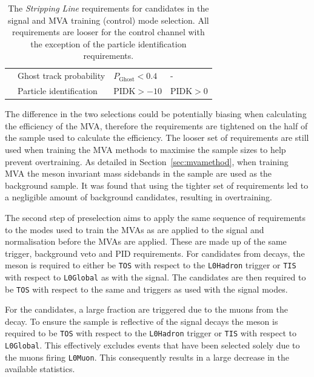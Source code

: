 \begin{table}[h]
\begin{center}
\begin{tabular}{ l l l l }
               & Ghost track probability        &  $P_{\text{Ghost}} < 0.4$            &  -                                      \\
               & Particle identification        &  $\text{PIDK}>-10$                   & $\text{PIDK}>0$                         \\ 
\hline
\end{tabular}
\end{center}
\caption{The \emph{Stripping Line} requirements for \decay{\phiz}{\Kp\Km} candidates in the signal and MVA training (control) mode selection. All requirements are looser for the control channel with the exception of the particle identification requirements.}
\label{tab:strippingrequirments_phi}
\end{table}

The difference in the two selections could be potentially biasing when calculating the efficiency of the MVA, therefore the requirements are tightened on the half of the \decay{\Bs}{\jpsi\phiz} sample used to calculate the efficiency. The looser set of requirements are still used when training the MVA methods to maximise the sample sizes to help prevent overtraining. As detailed in Section~\ref{sec:mvamethod}, when training MVA the \phiz meson invariant mass sidebands in the \decay{\Bs}{\jpsi\phiz} sample are used as the background sample. It was found that using the tighter set of requirements led to a negligible amount of background candidates, resulting in overtraining. 


The second step of preselection aims to apply the same sequence of requirements to the modes used to train the MVAs as are applied to the signal and normalisation before the MVAs are applied. These are made up of the same trigger, background veto and PID requirements.
For \Dsp candidates from \decay{\Bsb}{\Dsp\pim} decays, the \Bsb meson is required to either be \texttt{TOS} with respect to the \texttt{L0Hadron} trigger or \texttt{TIS} with respect to \texttt{L0Global} as with the signal. The \Bsb candidates are then required to be \texttt{TOS} with respect to the same \hltone and \hlttwo triggers as used with the signal modes.

For the \decay{\Bs}{\jpsi\phiz} candidates, a large fraction are triggered due to the muons from the \jpsi decay. To ensure the sample is reflective of the signal decays the \Bs meson is required to be \texttt{TOS} with respect to the \texttt{L0Hadron} trigger or \texttt{TIS} with respect to \texttt{L0Global}. This effectively excludes events that have been selected solely due to the muons firing \texttt{L0Muon}. This consequently results in a large decrease in the available statistics.

